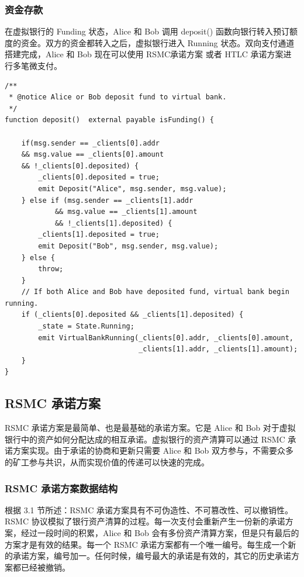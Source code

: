 \begin{appendices}
\subsubsection{资金存款}
在虚拟银行的 Funding 状态，Alice 和 Bob 调用 deposit() 函数向银行转入预订额度的资金。双方的资金都转入之后，虚拟银行进入 Running 状态。双向支付通道搭建完成，Alice 和 Bob 现在可以使用 RSMC承诺方案 或者 HTLC 承诺方案进行多笔微支付。

\begin{lstlisting}[caption={存款}, label={lst:deposit}]
/**
 * @notice Alice or Bob deposit fund to virtual bank.
 */
function deposit()  external payable isFunding() {

    if(msg.sender == _clients[0].addr 
    && msg.value == _clients[0].amount 
    && !_clients[0].deposited) {
        _clients[0].deposited = true;
        emit Deposit("Alice", msg.sender, msg.value);
    } else if (msg.sender == _clients[1].addr 
            && msg.value == _clients[1].amount 
            && !_clients[1].deposited) {
        _clients[1].deposited = true;
        emit Deposit("Bob", msg.sender, msg.value);
    } else {
        throw;
    }
    // If both Alice and Bob have deposited fund, virtual bank begin running.
    if (_clients[0].deposited && _clients[1].deposited) {
        _state = State.Running;
        emit VirtualBankRunning(_clients[0].addr, _clients[0].amount, 
                                _clients[1].addr, _clients[1].amount);
    }
}

\end{lstlisting}

\subsection{RSMC 承诺方案}

RSMC 承诺方案是最简单、也是最基础的承诺方案。它是 Alice 和 Bob 对于虚拟银行中的资产如何分配达成的相互承诺。虚拟银行的资产清算可以通过 RSMC 承诺方案实现。由于承诺的协商和更新只需要 Alice 和 Bob 双方参与，不需要众多的矿工参与共识，从而实现价值的传递可以快速的完成。

\subsubsection{RSMC 承诺方案数据结构}
根据 3.1 节所述：RSMC 承诺方案具有不可伪造性、不可篡改性、可以撤销性。RSMC 协议模拟了银行资产清算的过程。每一次支付会重新产生一份新的承诺方案，经过一段时间的积累，Alice 和 Bob 会有多份资产清算方案，但是只有最后的方案才是有效的结果。每一个 RSMC 承诺方案都有一个唯一编号。每生成一个新的承诺方案，编号加一。任何时候，编号最大的承诺是有效的，其它的历史承诺方案都已经被撤销。


\end{appendices}
